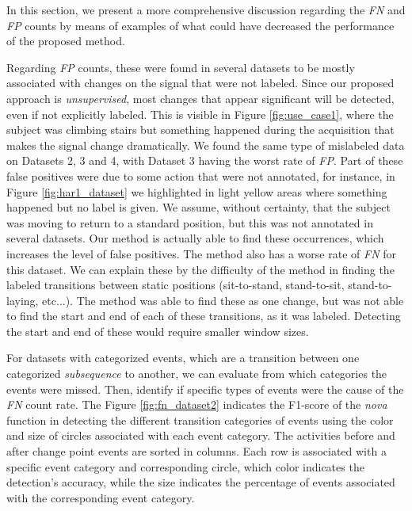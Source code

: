 In this section, we present a more comprehensive discussion regarding the \textit{FN} and \textit{FP} counts by means of examples of what could have decreased the performance of the proposed method.
\par
Regarding \textit{FP} counts, these were found in several datasets to be mostly associated with changes on the signal that were not labeled. Since our proposed approach is \textit{unsupervised}, most changes that appear significant will be detected, even if not explicitly labeled. This is visible in Figure \ref{fig:use_case1}, where the subject was climbing stairs but something happened during the acquisition that makes the signal change dramatically. We found the same type of mislabeled data on Datasets 2, 3 and 4, with Dataset 3 having the worst rate of \textit{FP}. Part of these false positives were due to some action that were not annotated, for instance, in Figure \ref{fig:har1_dataset} we highlighted in light yellow areas where something happened but no label is given. We assume, without certainty, that the subject was moving to return to a standard position, but this was not annotated in several datasets. Our method is actually able to find these occurrences, which increases the level of false positives. The method also has a worse rate of \textit{FN} for this dataset. We can explain these by the difficulty of the method in finding the labeled transitions between static positions (sit-to-stand, stand-to-sit, stand-to-laying, etc...). The method was able to find these as one change, but was not able to find the start and end of each of these transitions, as it was labeled. Detecting the start and end of these would require smaller window sizes.
\par
For datasets with categorized events, which are a transition between one categorized \textit{subsequence} to another, we can evaluate from which categories the events were missed. Then, identify if specific types of events were the cause of the \textit{FN} count rate. The Figure \ref{fig:fn_dataset2} indicates the F1-score of the \textit{nova} function in detecting the different transition categories of events using the color and size of circles associated with each event category. The activities before and after change point events are sorted in columns. Each row is associated with a specific event category and corresponding circle, which color indicates the detection's accuracy, while the size indicates the percentage of events associated with the corresponding event category.


